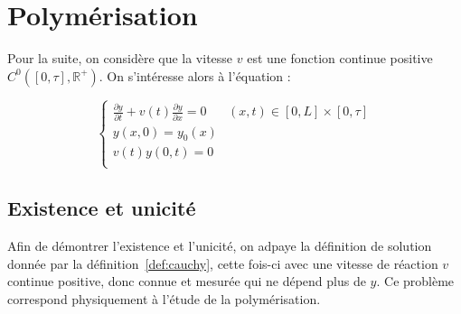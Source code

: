 \documentclass[a4paper]{article}
\begin{document}
\section{Polymérisation }

Pour la suite, on considère que la vitesse $v$ est une fonction continue positive $C^0([0,\tau],\mathbb{R}^+)$.
On s'intéresse alors à l'équation :

\begin{equation}
		\label{eq:pol}
		\begin{cases}
			\displaystyle \frac{\partial y}{\partial t}+ v(t) \frac{\partial y} {\partial x}  = 0 & (x,t) \in [0,L] \times [0, \tau] \\
             y(x,0) = y_{0} (x) \\
			 v(t)y(0,t) = 0 \\
		\end{cases}
\end{equation}

\subsection{Existence et unicité}

Afin de démontrer l'existence et l'unicité, on adpaye la définition de solution donnée par la définition~\ref{def:cauchy}, 
cette fois-ci avec une vitesse de réaction $v$ continue positive, donc connue et mesurée
qui ne dépend plus de $y$. 
Ce problème correspond physiquement à l'étude de la polymérisation.
\end{document}
